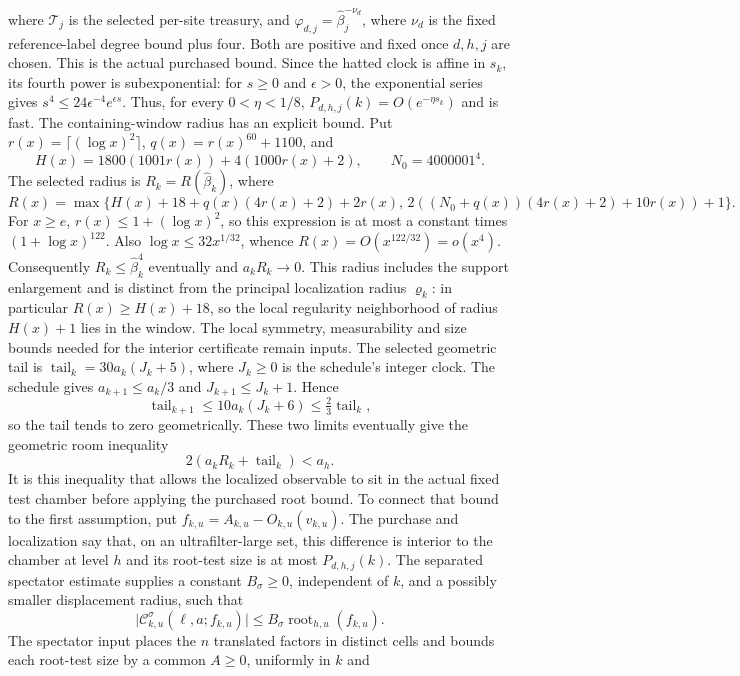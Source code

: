 where $\mathcal T_j$ is the selected per-site treasury, and
$\varphi_{d,j}=\widehat\beta_j^{-\nu_d}$, where $\nu_d$ is the fixed
reference-label degree bound plus four. Both are positive and fixed once
$d,h,j$ are chosen. This is the actual purchased bound. Since the hatted clock is affine in $s_k$, its
fourth power is subexponential: for $s\ge0$ and $\epsilon>0$, the
exponential series gives $s^4\le24\epsilon^{-4}e^{\epsilon s}$. Thus, for
every $0<\eta<1/8$, $P_{d,h,j}(k)=O(e^{-\eta s_k})$ and is fast. The containing-window radius
has an explicit bound. Put $r(x)=\lceil(\log x)^2\rceil$,
$q(x)=r(x)^{60}+1100$, and
\[
 H(x)=1800(1001r(x))+4(1000r(x)+2),\qquad N_0=4000001^4.
\]
The selected radius is $R_k=R(\widehat\beta_k)$, where
\[
 R(x)=\max\{H(x)+18+q(x)(4r(x)+2)+2r(x),\,
              2((N_0+q(x))(4r(x)+2)+10r(x))+1\}.
\]
For $x\ge e$, $r(x)\le1+(\log x)^2$, so this expression is at most a
constant times $(1+\log x)^{122}$. Also $\log x\le32x^{1/32}$, whence
$R(x)=O(x^{122/32})=o(x^4)$. Consequently
$R_k\le\widehat\beta_k^4$ eventually and $a_kR_k\to0$. This radius
includes the support enlargement and is distinct from the principal
localization radius $\varrho_k$: in particular $R(x)\ge H(x)+18$, so the
local regularity neighborhood of radius $H(x)+1$ lies in the window.
The local symmetry, measurability and size bounds needed for the interior
certificate remain inputs. The selected geometric tail is
$\operatorname{tail}_k=30a_k(J_k+5)$, where $J_k\ge0$ is the schedule's
integer clock. The schedule gives $a_{k+1}\le a_k/3$ and
$J_{k+1}\le J_k+1$. Hence
\[
 \operatorname{tail}_{k+1}
 \le10a_k(J_k+6)\le\tfrac23\operatorname{tail}_k,
\]
so the tail tends to zero geometrically. These two limits eventually give
the geometric room inequality
\[
 2(a_kR_k+\operatorname{tail}_k)<a_h.
\]
It is this inequality that allows the localized observable to sit in the
actual fixed test chamber before applying the purchased root bound.
To connect that bound to the first assumption, put
$f_{k,u}=A_{k,u}-O_{k,u}(v_{k,u})$. The purchase and localization say that,
on an ultrafilter-large set, this difference is interior to the chamber at
level $h$ and its root-test size is at most $P_{d,h,j}(k)$. The separated
spectator estimate supplies a constant $B_\sigma\ge0$, independent of $k$,
and a possibly smaller displacement radius, such that
\[
 \bigl|\mathcal C^{\sigma}_{k,u}(\ell,a;f_{k,u})\bigr|
 \le B_\sigma\operatorname{root}_{h,u}(f_{k,u}).
\]
The spectator input places the $n$ translated factors in distinct cells
and bounds each root-test size by a common $A\ge0$, uniformly in $k$ and
